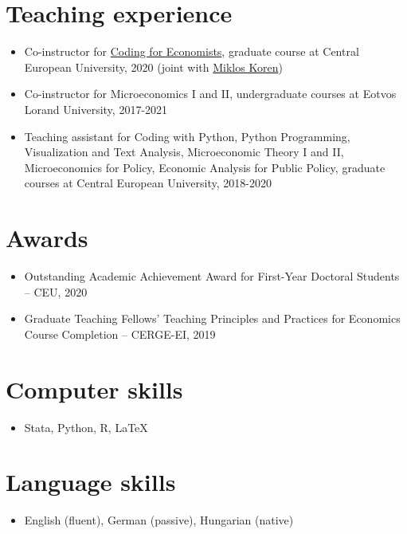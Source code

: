 \documentclass[a4paper,11pt]{article}
\begin{document}
\section*{Teaching experience}
\begin{itemize}
  \item Co-instructor for \href{https://ceu-economics-and-business.github.io/2020-11-10-ECBS-5241-Coding-for-Economists/}{Coding for Economists}, graduate course at Central European University, 2020 (joint with \href{https://koren.mk}{Miklos Koren})
  \item Co-instructor for Microeconomics I and II, undergraduate courses at Eotvos Lorand University, 2017-2021
  \item Teaching assistant for Coding with Python, Python Programming, Visualization and Text Analysis, Microeconomic Theory I and II, Microeconomics for Policy, Economic Analysis for Public Policy, graduate courses at Central European University, 2018-2020
\end{itemize}

\section*{Awards}
\begin{itemize}
\item Outstanding Academic Achievement Award for First-Year Doctoral Students – CEU, 2020
\item Graduate Teaching Fellows’ Teaching Principles and Practices for Economics Course Completion – CERGE-EI, 2019
\end{itemize}

\section*{Computer skills}
\begin{itemize}
\item Stata, Python, R, \LaTeX
\end{itemize}

\section*{Language skills}
\begin{itemize}
\item English (fluent), German (passive), Hungarian (native)
\end{itemize}

\end{document}
